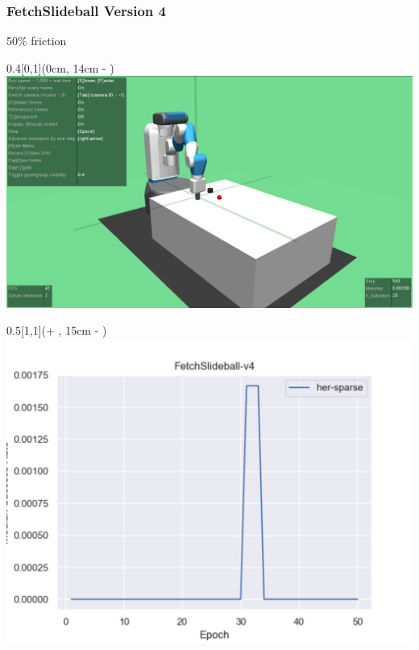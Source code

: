 





\begin{frame}
	\frametitle{FetchSlideball Version 4}	
	\vspace{1cm}
	
	50\% friction
	
	\begin{textblock*}{0.4\paperwidth}[0,1](0cm, 14cm - \PraesentationSeitenrand)%
		\includegraphics[width=0.4\paperwidth]{./Ressourcen/Figures/FetchSlideball-v4.pdf}
	\end{textblock*}
	
	\begin{textblock*}{0.5\paperwidth}[1,1](\textwidth + \PraesentationSeitenrand, 15cm - \PraesentationSeitenrand)%
		\includegraphics[width=0.5\paperwidth]{./Ressourcen/Figures/fig_FetchSlideball-v4.pdf}
	\end{textblock*}
	
\end{frame}
\clearpage

